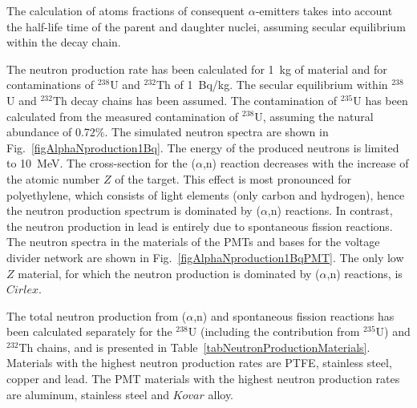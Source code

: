 The calculation of atoms fractions of consequent $\alpha$-emitters takes into account the half-life time of the parent and daughter nuclei, assuming secular equilibrium within the decay chain.

The neutron production rate has been calculated for 1~kg of material and for contaminations of  $^{238}$U and $^{232}$Th of 1~Bq/kg. The secular equilibrium within $^{238}$U and $^{232}$Th decay chains has been assumed. The contamination of $^{235}$U has been calculated from the measured contamination of $^{238}$U, assuming the natural abundance of 0.72\%. The simulated neutron spectra are shown in Fig.~\ref{figAlphaNproduction1Bq}. The energy of the produced neutrons is limited to 10~MeV. The cross-section for the ($\alpha$,n) reaction decreases with the increase of the atomic number $Z$ of the target. This effect is  most pronounced for polyethylene, which consists of light elements (only carbon and hydrogen), hence the neutron production spectrum is dominated by ($\alpha$,n) reactions. In contrast, the neutron production in lead is entirely due to spontaneous fission reactions. 
The neutron spectra in the materials of the PMTs and bases for the voltage divider network are shown in Fig.~\ref{figAlphaNproduction1BqPMT}. The only low $Z$ material, for which the neutron production is dominated by ($\alpha$,n) reactions, is $Cirlex$.

The total neutron production from ($\alpha$,n) and spontaneous fission reactions has been calculated separately for the $^{238}$U (including the contribution from $^{235}$U) and $^{232}$Th chains, and is presented in Table~\ref{tabNeutronProductionMaterials}. Materials with the highest neutron production rates are PTFE, stainless steel, copper and lead. The PMT materials with the highest neutron production rates are aluminum, stainless steel and $Kovar$ alloy.

